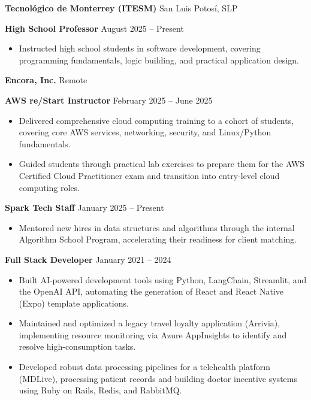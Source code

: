 \documentclass[11pt]{article}
\begin{document}
\textbf{Tecnológico de Monterrey (ITESM)} \hfill San Luis Potosí, SLP

\textbf{High School Professor} \hfill August 2025 – Present
\begin{itemize}[noitemsep, topsep=0pt, partopsep=0pt, parsep=0pt]
    \item Instructed high school students in software development, covering programming fundamentals, logic building, and practical application design.
\end{itemize}

\vspace{8pt}

\textbf{Encora, Inc.} \hfill Remote

\textbf{AWS re/Start Instructor} \hfill February 2025 – June 2025
\begin{itemize}[noitemsep, topsep=0pt, partopsep=0pt, parsep=0pt]
    \item Delivered comprehensive cloud computing training to a cohort of students, covering core AWS services, networking, security, and Linux/Python fundamentals.
    \item Guided students through practical lab exercises to prepare them for the AWS Certified Cloud Practitioner exam and transition into entry-level cloud computing roles.
\end{itemize}

\vspace{8pt}

\textbf{Spark Tech Staff} \hfill January 2025 – Present
\begin{itemize}[noitemsep, topsep=0pt, partopsep=0pt, parsep=0pt]
    \item Mentored new hires in data structures and algorithms through the internal Algorithm School Program, accelerating their readiness for client matching.
\end{itemize}

\vspace{8pt}

\textbf{Full Stack Developer} \hfill January 2021 – 2024
\begin{itemize}[noitemsep, topsep=0pt, partopsep=0pt, parsep=0pt]
    \item Built AI-powered development tools using Python, LangChain, Streamlit, and the OpenAI API, automating the generation of React and React Native (Expo) template applications.
    \item Maintained and optimized a legacy travel loyalty application (Arrivia), implementing resource monitoring via Azure AppInsights to identify and resolve high-consumption tasks.
    \item Developed robust data processing pipelines for a telehealth platform (MDLive), processing patient records and building doctor incentive systems using Ruby on Rails, Redis, and RabbitMQ.
\end{itemize}
\end{document}
